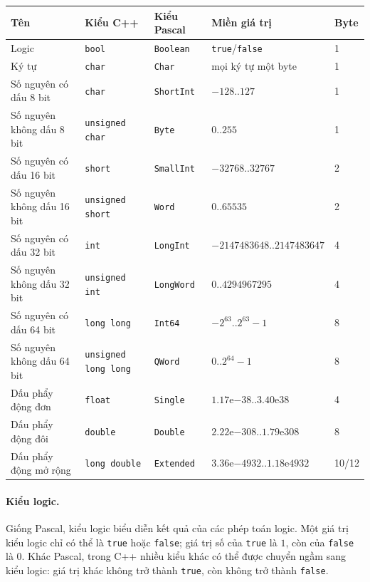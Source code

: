 \documentclass[11pt]{article}
\newcommand{\cpp}{C++}
\newcommand{\pascal}{Pascal}
\begin{document}
\begin{center}
\small
\begin{tabular}{lllll}
\hline
\textbf{Tên} & \textbf{Kiểu \cpp{}} & \textbf{Kiểu \pascal{}} &
\textbf{Miền giá trị} & \textbf{Byte}\\
\hline
Logic & \verb|bool| & \verb|Boolean| & \verb|true|/\verb|false| & 1\\
Ký tự & \verb|char| & \verb|Char| & mọi ký tự một byte & 1\\
Số nguyên có dấu 8 bit & \verb|char| & \verb|ShortInt| & \(-128..127\) & 1\\
Số nguyên không dấu 8 bit & \verb|unsigned char| & \verb|Byte| & \(0..255\) & 1\\
Số nguyên có dấu 16 bit & \verb|short| & \verb|SmallInt| & \(-32768..32767\) & 2\\
Số nguyên không dấu 16 bit & \verb|unsigned short| & \verb|Word| & \(0..65535\) & 2\\
Số nguyên có dấu 32 bit & \verb|int| & \verb|LongInt| &
\(-2147483648..2147483647\) & 4\\
Số nguyên không dấu 32 bit & \verb|unsigned int| & \verb|LongWord| &
\(0..4294967295\) & 4\\
Số nguyên có dấu 64 bit & \verb|long long| & \verb|Int64| & \(-2^{63}..2^{63}-1\) & 8\\
Số nguyên không dấu 64 bit & \verb|unsigned long long| & \verb|QWord| & \(0..2^{64}-1\) & 8\\
Dấu phẩy động đơn & \verb|float| & \verb|Single| & \(1.17\mathrm{e}{-38}..3.40\mathrm{e}{38}\) & 4\\
Dấu phẩy động đôi & \verb|double| & \verb|Double| & \(2.22\mathrm{e}{-308}..1.79\mathrm{e}{308}\) & 8\\
Dấu phẩy động mở rộng & \verb|long double| & \verb|Extended| &
\(3.36\mathrm{e}{-4932}..1.18\mathrm{e}{4932}\) & 10/12\\
\hline
\end{tabular}
\end{center}

\paragraph{Kiểu logic.}
Giống \pascal{}, kiểu logic biểu diễn kết quả của các phép toán logic. Một
giá trị kiểu logic chỉ có thể là \verb|true| hoặc \verb|false|; giá trị số
của \verb|true| là \(1\), còn của \verb|false| là \(0\). Khác \pascal{}, trong
\cpp{} nhiều kiểu khác có thể được chuyển ngầm sang kiểu logic: giá trị khác
không trở thành \verb|true|, còn không trở thành \verb|false|.
\end{document}
